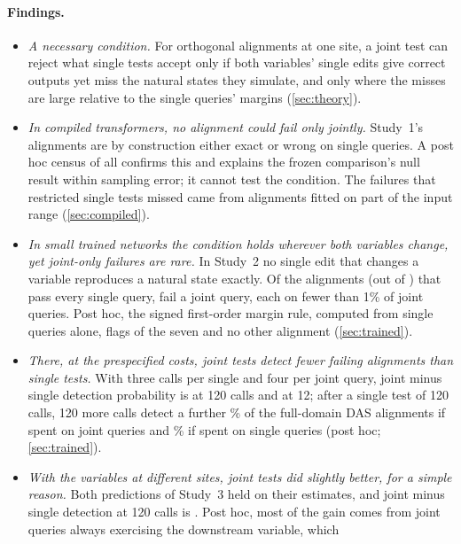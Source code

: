 \paragraph{Findings.}
\begin{itemize}
  \item \emph{A necessary condition.} For orthogonal alignments at one site, a joint test can reject what single
  tests accept only if both variables' single edits give correct outputs yet miss
  the natural states they simulate, and only where the misses are large relative to the single queries' margins
  (\cref{sec:theory}).
  \item \emph{In compiled transformers, no alignment could fail only jointly.} Study~1's alignments are by
  construction either exact or wrong on single queries. A post hoc census of all \CmpCandidates{} confirms this and
  explains the frozen comparison's null result within sampling error; it cannot test the condition. The failures
  that restricted single tests missed came from alignments fitted on part of the input range (\cref{sec:compiled}).
  \item \emph{In small trained networks the condition holds wherever both variables change, yet joint-only failures
  are rare.} In Study~2 no single edit that changes a variable reproduces a natural state exactly. Of the
  \TrnPerfect{} alignments (out of \TrnCandidates) that pass every single query, \TrnPerfectJointFailWord{} fail a
  joint query, each on fewer than 1\% of joint queries. Post hoc, the signed first-order margin rule, computed from
  single queries alone, flags \TrnMbRuleFlagged{} of the seven and no other alignment (\cref{sec:trained}).
  \item \emph{There, at the prespecified costs, joint tests detect fewer failing alignments than single tests.} With
  three calls per single and four per joint query, joint minus single detection probability is
  \TrnContrastOneTwenty{} \TrnContrastOneTwentyCI{} at 120 calls and \TrnContrastTwelve{} at 12; after a single test
  of 120 calls, 120 more calls detect a further \TrnAddonJoint\% of the full-domain DAS alignments if spent on joint
  queries and \TrnAddonSingle\% if spent on single queries (post hoc; \cref{sec:trained}).
  \item \emph{With the variables at different sites, joint tests did slightly better, for a simple reason.} Both
  predictions of Study~3 held on their estimates, and joint minus single detection at 120 calls is \MsContrast{}
  \MsContrastCI. Post hoc, most of the gain comes from joint queries always exercising the downstream variable, which

\end{itemize}
